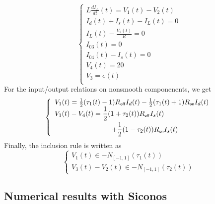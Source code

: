 \begin{equation}
  \label{eq:72}
 \left\{ 
    \begin{array}{l}
      L  \frac{dI_L}{dt}(t) = V_1(t)-V_2(t) \\
      I_d(t)+I_s(t)-I_L(t)=0 \\
      I_L(t)-\frac{V_2(t)}{R}=0\\
      I_{03}(t)=0\\
      I_{04}(t)-I_{s}(t)=0\\
      V_4(t)=20\\
      V_3=e(t)\\
\end{array}\right.
\end{equation}
For the input/output relations on nonsmooth componenents, we get
\begin{equation}
 \left\{ \begin{array}{l}
V_{1}(t)=\frac{1}{2}(\tau_{1}(t)-1)R_\off I_{d}(t)-\frac{1}{2}(\tau_{1}(t)+1) R_\on I_{d}(t) \\ 
\begin{split}
 V_{1}(t)-V_{4}(t)= \frac{1}{2}(1+\tau_{2}(t)) R_\off I_{s}(t)
  \quad\quad \\+\frac{1}{2}(1-\tau_{2}(t)) R_\on I_{s}(t)
\end{split}
  \end{array} \right.
\end{equation}
 Finally, the inclusion rule is written as
\begin{equation}
  \left\{\begin{array}{l}
      V_{1}(t) \in - N_{[-1,1]}(\tau_{1}(t)) \\   V_{3}(t)-V_{2}(t) \in -N_{[-1,1]}(\tau_{2}(t))
    \end{array} 
\right.
\end{equation}

\subsection{Numerical results with {\sc Siconos}}
\label{section32}

